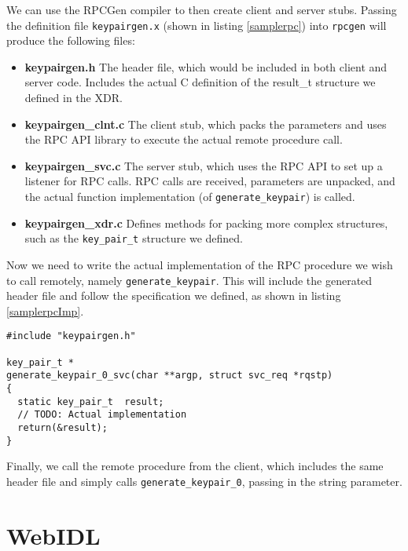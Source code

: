 We can use the RPCGen compiler to then create client and server stubs. Passing the definition file \verb+keypairgen.x+ (shown in listing \ref{samplerpc}) into \verb+rpcgen+ will produce the following files:

\begin{itemize}
	\item \textbf{keypairgen.h} The header file, which would be included in both client and server code. Includes the actual C definition of the result\_t structure we defined in the XDR.
	\item \textbf{keypairgen\_clnt.c} The client stub, which packs the parameters and uses the RPC API library to execute the actual remote procedure call.
	\item \textbf{keypairgen\_svc.c} The server stub, which uses the RPC API to set up a listener for RPC calls. RPC calls are received, parameters are unpacked, and the actual function implementation (of \verb+generate_keypair+) is called.
	\item \textbf{keypairgen\_xdr.c} Defines methods for packing more complex structures, such as the \verb+key_pair_t+ structure we defined.
\end{itemize}

Now we need to write the actual implementation of the RPC procedure we wish to call remotely, namely \verb+generate_keypair+. This will include the generated header file and follow the specification we defined, as shown in listing \ref{samplerpcImp}. \\


\begin{lstlisting}
#include "keypairgen.h"

key_pair_t *
generate_keypair_0_svc(char **argp, struct svc_req *rqstp)
{
  static key_pair_t  result;
  // TODO: Actual implementation
  return(&result);
}
\end{lstlisting}

Finally, we call the remote procedure from the client, which includes the same header file and simply calls \verb+generate_keypair_0+, passing in the string parameter.



\section{WebIDL}


